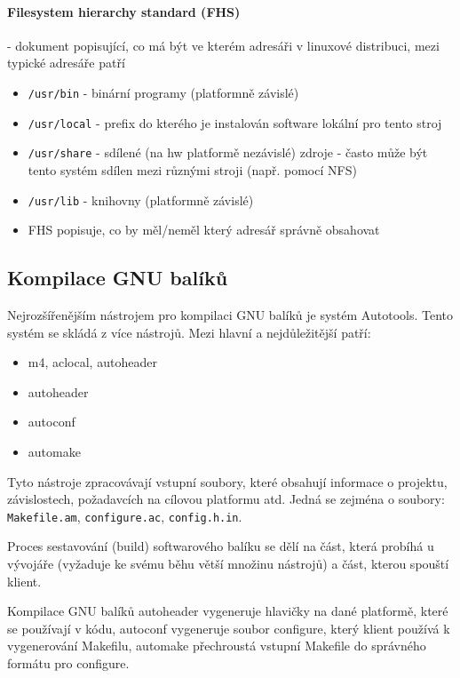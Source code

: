 \paragraph{Filesystem hierarchy standard (FHS)} - dokument popisující, co má být ve kterém adresáři v linuxové distribuci, mezi typické adresáře patří
\begin{itemize}[itemsep=0px]
\item \texttt{/usr/bin} - binární programy (platformně závislé)
\item \texttt{/usr/local} - prefix do kterého je instalován software lokální pro tento stroj
\item \texttt{/usr/share} - sdílené (na hw platformě nezávislé) zdroje - často může být tento systém sdílen mezi různými stroji (např. pomocí NFS)
\item \texttt{/usr/lib} - knihovny (platformně závislé)
\item FHS popisuje, co by měl/neměl který adresář správně obsahovat
\end{itemize}

\subsection{Kompilace GNU balíků}
Nejrozšířenějším nástrojem pro kompilaci GNU balíků je systém Autotools. Tento systém se skládá z více nástrojů. Mezi hlavní a nejdůležitější patří:
\begin{itemize}[itemsep=0px]
\item m4, aclocal, autoheader
\item autoheader
\item autoconf
\item automake
\end{itemize}

Tyto nástroje zpracovávají vstupní soubory, které obsahují informace o projektu, závislostech, požadavcích na cílovou platformu atd. Jedná se zejména o soubory: \texttt{Makefile.am}, \texttt{configure.ac}, \texttt{config.h.in}.

Proces sestavování (build) softwarového balíku se dělí na část, která probíhá u vývojáře (vyžaduje ke svému běhu větší množinu nástrojů) a část, kterou spouští klient.

Kompilace GNU balíků autoheader vygeneruje hlavičky na dané platformě, které se používají v kódu, autoconf vygeneruje soubor configure, který klient používá k vygenerování Makefilu, automake přechroustá vstupní Makefile do správného formátu pro configure.

